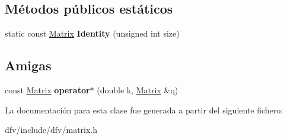 \subsection*{\-Métodos públicos estáticos}
\begin{DoxyCompactItemize}
\item 
\hypertarget{classdfv_1_1Matrix_a36185fb596e40320f3a3755e11ebf992}{static const \hyperlink{classdfv_1_1Matrix}{\-Matrix} {\bfseries \-Identity} (unsigned int size)}\label{classdfv_1_1Matrix_a36185fb596e40320f3a3755e11ebf992}

\end{DoxyCompactItemize}
\subsection*{\-Amigas}
\begin{DoxyCompactItemize}
\item 
\hypertarget{classdfv_1_1Matrix_a7a2b6c71251efd460f3eafd44f7d497b}{const \hyperlink{classdfv_1_1Matrix}{\-Matrix} {\bfseries operator$\ast$} (double k, \hyperlink{classdfv_1_1Matrix}{\-Matrix} \&q)}\label{classdfv_1_1Matrix_a7a2b6c71251efd460f3eafd44f7d497b}

\end{DoxyCompactItemize}


\-La documentación para esta clase fue generada a partir del siguiente fichero\-:\begin{DoxyCompactItemize}
\item 
dfv/include/dfv/matrix.\-h\end{DoxyCompactItemize}
